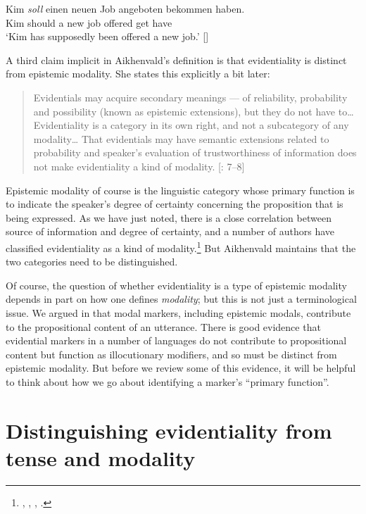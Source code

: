 \ea \label{ex:17.4}
\gll Kim  \textit{soll}  einen  neuen  Job  angeboten  bekommen  haben.\\
Kim  should a  new  job  offered  get  have\\
\glt ‘Kim has supposedly been offered a new job.’  [\citealt{vonFintel2006}]
\z


A third claim implicit in Aikhenvald’s definition is that evidentiality is distinct from epistemic modality. She states this explicitly a bit later:


\begin{quote}
Evidentials may acquire secondary meanings — of reliability, probability and possibility (known as epistemic extensions), but they do not have to… Evidentiality is a category in its own right, and not a subcategory of any modality… That evidentials may have semantic extensions related to probability and speaker’s evaluation of trustworthiness of information does not make evidentiality a kind of modality. [\citealt{Aikhenvald2004}: 7–8]
\end{quote}


Epistemic modality of course is the linguistic category whose primary function is to indicate the speaker’s degree of certainty concerning the proposition that is being expressed. As we have just noted, there is a close correlation between source of information and degree of certainty, and a number of authors have classified evidentiality as a kind of modality.\footnote{\citet{Palmer1986}, \citet{Frawley1992}, \citet{MatthewsonEtAl2007}, \citet{Izvorski1997}.} But Aikhenvald maintains that the two categories need to be distinguished. 



Of course, the question of whether evidentiality is a type of epistemic modality depends in part on how one defines \textit{modality}; but this is not just a terminological issue. We argued in  that modal markers, including epistemic modals, contribute to the propositional content of an utterance. There is good evidence that evidential markers in a number of languages do not contribute to propositional content but function as illocutionary modifiers, and so must be distinct from epistemic modality. But before we review some of this evidence, it will be helpful to think about how we go about identifying a marker’s “primary function”.


\section{Distinguishing evidentiality from tense and modality}\label{sec:17.4}

